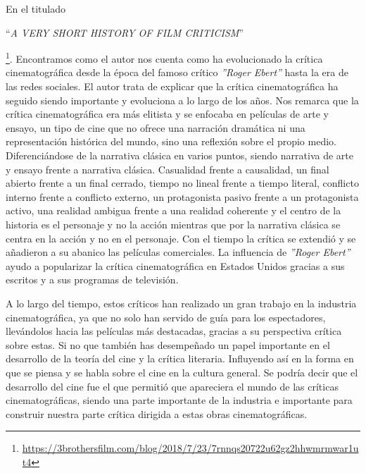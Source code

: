 En el titulado \begin{otherlanguage}{english}``\textit{A VERY SHORT HISTORY OF FILM 
CRITICISM}''\end{otherlanguage}\cite{3BrothersArticle}
\footnote{\url{https://3brothersfilm.com/blog/2018/7/23/7rnnqs20722u62gz2hhwmrmwar1ut4}}. Encontramos como 
el autor nos cuenta como ha evolucionado la crítica cinematográfica desde la época del famoso crítico 
\textit{''Roger Ebert''} hasta la era de las redes sociales. El autor trata de explicar que la crítica 
cinematográfica ha seguido siendo importante y evoluciona a lo largo de los años. Nos remarca que la 
crítica cinematográfica era más elitista y se enfocaba en películas de arte y ensayo, un tipo de cine que 
no ofrece una narración dramática ni una representación histórica del mundo, sino una reflexión sobre el 
propio medio. Diferenciándose de la narrativa clásica en varios puntos, siendo narrativa de arte y ensayo 
frente a narrativa clásica. Casualidad frente a  causalidad, un final abierto frente a un final cerrado, 
tiempo no lineal frente a tiempo literal, conflicto interno frente a conflicto externo, un protagonista 
pasivo frente a un protagonista activo, una realidad ambigua frente a una realidad coherente y el centro 
de la historia es el personaje y no la acción mientras que por la narrativa clásica se centra en la acción 
y no en el personaje. Con el tiempo la crítica se extendió y se añadieron a su abanico las películas 
comerciales. La influencia de \textit{''Roger Ebert''} ayudo a popularizar la crítica cinematográfica en 
Estados Unidos gracias a sus escritos y a sus programas de televisión. 

A lo largo del tiempo, estos críticos han realizado un gran trabajo en la industria cinematográfica, ya 
que no solo han servido de guía para los espectadores, llevándolos hacia las películas más destacadas, 
gracias a su perspectiva crítica sobre estas. Si no que también has desempeñado un papel importante en el 
desarrollo de la teoría del cine y la crítica literaria. Influyendo así en la forma en que se piensa y se 
habla sobre el cine en la cultura general. Se podría decir que el desarrollo del cine fue el que permitió 
que apareciera el mundo de las críticas cinematográficas, siendo una parte importante de la industria e 
importante para construir nuestra parte crítica dirigida a estas obras cinematográficas.

